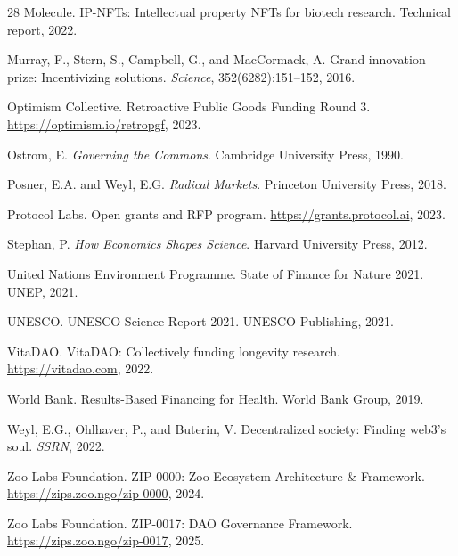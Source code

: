 \documentclass[11pt,letterpaper]{article}
\begin{document}
\begin{thebibliography}{28}
Molecule.
\newblock IP-NFTs: Intellectual property NFTs for biotech research.
\newblock Technical report, 2022.

Murray, F., Stern, S., Campbell, G., and MacCormack, A.
\newblock Grand innovation prize: Incentivizing solutions.
\newblock \emph{Science}, 352(6282):151--152, 2016.

Optimism Collective.
\newblock Retroactive Public Goods Funding Round 3.
\newblock \url{https://optimism.io/retropgf}, 2023.

Ostrom, E.
\newblock \emph{Governing the Commons}.
\newblock Cambridge University Press, 1990.

Posner, E.A. and Weyl, E.G.
\newblock \emph{Radical Markets}.
\newblock Princeton University Press, 2018.

Protocol Labs.
\newblock Open grants and RFP program.
\newblock \url{https://grants.protocol.ai}, 2023.

Stephan, P.
\newblock \emph{How Economics Shapes Science}.
\newblock Harvard University Press, 2012.

United Nations Environment Programme.
\newblock State of Finance for Nature 2021.
\newblock UNEP, 2021.

UNESCO.
\newblock UNESCO Science Report 2021.
\newblock UNESCO Publishing, 2021.

VitaDAO.
\newblock VitaDAO: Collectively funding longevity research.
\newblock \url{https://vitadao.com}, 2022.

World Bank.
\newblock Results-Based Financing for Health.
\newblock World Bank Group, 2019.

Weyl, E.G., Ohlhaver, P., and Buterin, V.
\newblock Decentralized society: Finding web3's soul.
\newblock \emph{SSRN}, 2022.

Zoo Labs Foundation.
\newblock ZIP-0000: Zoo Ecosystem Architecture \& Framework.
\newblock \url{https://zips.zoo.ngo/zip-0000}, 2024.

Zoo Labs Foundation.
\newblock ZIP-0017: DAO Governance Framework.
\newblock \url{https://zips.zoo.ngo/zip-0017}, 2025.


\end{thebibliography}
\end{document}
